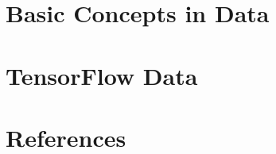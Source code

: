 \section[Intro]{Basic Concepts in Data}


% 

\section[TfData]{TensorFlow Data}


\section[Refs]{References}


